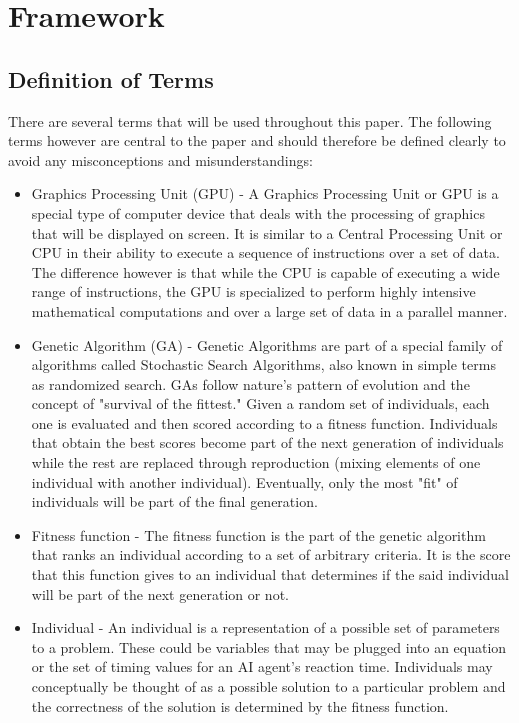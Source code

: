 \chapter{Framework}

\section{Definition of Terms}

There are several terms that will be used throughout this paper.
The following terms however are central to the paper and should therefore be defined clearly
to avoid any misconceptions and misunderstandings:

\begin{itemize}
 \item Graphics Processing Unit (GPU) -  A Graphics Processing Unit or GPU is a special type
of computer device that deals with the processing of graphics that will be displayed
on screen. It is similar to a Central Processing Unit or CPU in their ability to execute
a sequence of instructions over a set of data. The difference however is that while the
CPU is capable of executing a wide range of instructions, the GPU is specialized to perform
highly intensive mathematical computations and over a large set of data in a parallel manner.

 \item Genetic Algorithm (GA) - Genetic Algorithms are part of a special family of algorithms
called Stochastic Search Algorithms, also known in simple terms as randomized search. GAs
follow nature's pattern of evolution and the concept of "survival of the fittest." Given
a random set of individuals, each one is evaluated and then scored according to a fitness function.
Individuals that obtain the best scores become part of the next generation of individuals while the
rest are replaced through reproduction (mixing elements of one individual with another individual).
Eventually, only the most "fit" of individuals will be part of the final generation.

 \item Fitness function - The fitness function is the part of the genetic algorithm that ranks
an individual according to a set of arbitrary criteria. It is the score that this function
gives to an individual that determines if the said individual will be part of the next generation
or not.

 \item Individual - An individual is a representation of a possible set of parameters to a problem.
These could be variables that may be plugged into an equation or the set of timing values for an
AI agent's reaction time. Individuals may conceptually be thought of as a possible solution to a
particular problem and the correctness of the solution is determined by the fitness function.


\end{itemize}
